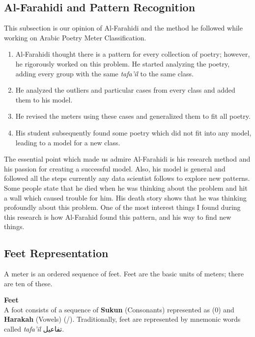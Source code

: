 \subsection{Al-Farahidi and Pattern Recognition}

This subsection is our opinion of Al-Farahidi and the method he followed while working on Arabic Poetry Meter Classification.

\begin{enumerate}
  \item Al-Farahidi thought there is a pattern for every collection of poetry; however, he rigorously worked on this problem. He started analyzing the poetry, adding every group with the same \textit{tafa'il} to the same class.
  \item He analyzed the outliers and particular cases from every class and added them to his model.
  \item He revised the meters using these cases and generalized them to fit all poetry.
  \item His student subsequently found some poetry which did not fit into any model, leading to a model for a new class.
\end{enumerate}

The essential point which made us admire Al-Farahidi is his research method and his passion for creating a successful model. Also, his model is general and followed all the steps currently any data scientist follows to explore new patterns. Some people state that he died when he was thinking about the problem and hit a wall which caused trouble for him. His death story shows that he was thinking profoundly about this problem. One of the most interest things I found during this research is how Al-Farahid found this pattern, and his way to find new things.

\subsection{Feet Representation}
A meter is an ordered sequence of feet. Feet are the basic units of meters; there are ten of these.

\begin{definition}\label{def:feet}
  \textbf{Feet} \hfill \\  A foot consists of a sequence of \textbf{Sukun} (Consonants) represented as (0) and \textbf{Harakah} (Vowels) (/). Traditionally, feet are represented by mnemonic words called \textit{tafa’il} \textarabic{تفاعيل}.
\end{definition}

